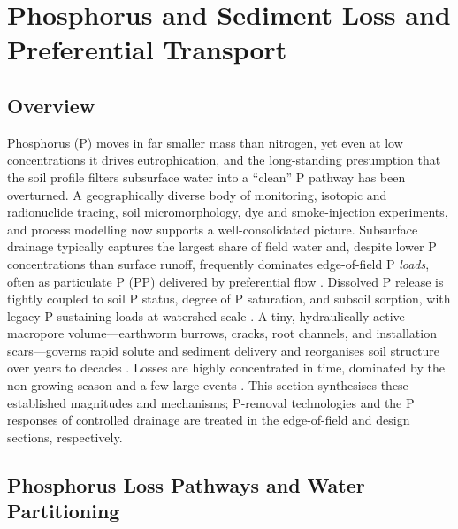 \documentclass[11pt]{article}
\begin{document}
\section*{Phosphorus and Sediment Loss and Preferential Transport}

\subsection{Overview}

Phosphorus (P) moves in far smaller mass than nitrogen, yet even at low
concentrations it drives eutrophication, and the long-standing presumption
that the soil profile filters subsurface water into a ``clean'' P pathway
has been overturned. A geographically diverse body of monitoring, isotopic
and radionuclide tracing, soil micromorphology, dye and smoke-injection
experiments, and process modelling now supports a well-consolidated
picture. Subsurface drainage typically captures the largest share of field
water and, despite lower P concentrations than surface runoff, frequently
dominates edge-of-field P \emph{loads}, often as particulate P (PP)
delivered by preferential flow
\parencite{Pease2018,VanEsbroeck2016,Uusitalo2001,Laubel1999}. Dissolved P
release is tightly coupled to soil P status, degree of P saturation, and
subsoil sorption, with legacy P sustaining loads at watershed scale
\parencite{Sharpley1995,Beauchemin2003,Jarvie2017}. A tiny, hydraulically
active macropore volume---earthworm burrows, cracks, root channels, and
installation scars---governs rapid solute and sediment delivery and
reorganises soil structure over years to decades
\parencite{Shipitalo2004,Villholth1998,Montagne2008}. Losses are highly
concentrated in time, dominated by the non-growing season and a few large
events \parencite{VanEsbroeck2016,Brendel2019}. This section synthesises
these established magnitudes and mechanisms; P-removal technologies and the
P responses of controlled drainage are treated in the edge-of-field and
design sections, respectively.

\subsection{Phosphorus Loss Pathways and Water Partitioning}
\end{document}
